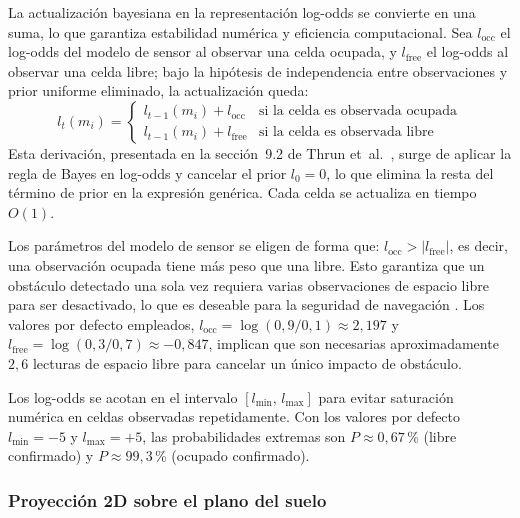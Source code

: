La actualización bayesiana en la representación log-odds se convierte en una
suma, lo que garantiza estabilidad numérica y eficiencia computacional. Sea
$l_{\text{occ}}$ el log-odds del modelo de sensor al observar una celda
ocupada, y $l_{\text{free}}$ el log-odds al observar una celda libre; bajo la
hipótesis de independencia entre observaciones y prior uniforme eliminado,
la actualización queda:
%
\begin{equation}
  \label{eq:logodds-update}
  l_t(m_i) =
  \begin{cases}
    l_{t-1}(m_i) + l_{\text{occ}} & \text{si la celda es observada ocupada}\\
    l_{t-1}(m_i) + l_{\text{free}} & \text{si la celda es observada libre}
  \end{cases}
\end{equation}
%
Esta derivación, presentada en la sección~9.2 de Thrun et~al.~\cite{Thrun2005},
surge de aplicar la regla de Bayes en log-odds y cancelar el prior
$l_0 = 0$, lo que elimina la resta del término de prior en la expresión
genérica. Cada celda se actualiza en tiempo $O(1)$.

Los parámetros del modelo de sensor se eligen de forma que:
$l_{\text{occ}} > |l_{\text{free}}|$, es decir, una observación ocupada tiene
más peso que una libre. Esto garantiza que un obstáculo detectado una sola vez
requiera varias observaciones de espacio libre para ser desactivado, lo que es
deseable para la seguridad de navegación \cite{Elfes1989}. Los valores por
defecto empleados, $l_{\text{occ}} = \log(0{,}9/0{,}1) \approx 2{,}197$ y
$l_{\text{free}} = \log(0{,}3/0{,}7) \approx {-0{,}847}$, implican que son
necesarias aproximadamente $2{,}6$ lecturas de espacio libre para cancelar un
único impacto de obstáculo.

Los log-odds se acotan en el intervalo $[l_{\min},\, l_{\max}]$ para evitar
saturación numérica en celdas observadas repetidamente. Con los valores por
defecto $l_{\min} = -5$ y $l_{\max} = +5$, las probabilidades extremas son
$P \approx 0{,}67\,$\% (libre confirmado) y $P \approx 99{,}3\,$\% (ocupado
confirmado).

\subsubsection{Proyección 2D sobre el plano del suelo}
\label{subsubsec:lm-v5-proyeccion}

